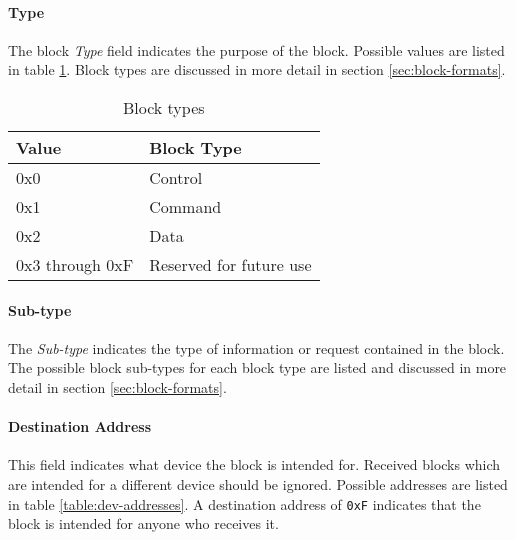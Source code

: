 \paragraph{Type}
The block \emph{Type} field indicates the purpose of the block. Possible values are listed in table
\ref{table:block-types}. Block types are discussed in more detail in section \ref{sec:block-formats}.

\begin{table}[H]
    \centering
    \begin{tabular}{@{}ll@{}}
        \toprule
        Value           & Block Type              \\
        \midrule
        0x0             & Control                 \\
        0x1             & Command                 \\
        0x2             & Data                    \\
        0x3 through 0xF & Reserved for future use \\
        \bottomrule
    \end{tabular}
    \caption{Block types}
    \label{table:block-types}
\end{table}

\paragraph{Sub-type}
The \emph{Sub-type} indicates the type of information or request contained in the block. The possible block sub-types
for each block type are listed and discussed in more detail in section \ref{sec:block-formats}.

\paragraph{Destination Address}
This field indicates what device the block is intended for. Received blocks which are intended for a different device
should be ignored. Possible addresses are listed in table \ref{table:dev-addresses}. A destination address of
\lstinline{0xF} indicates that the block is intended for anyone who receives it.
